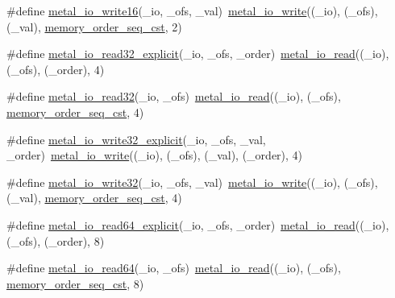 \begin{DoxyCompactItemize}
\item 
\#define \hyperlink{group__io_gab8016df69fa1998ac33c21a80e59c877}{metal\+\_\+io\+\_\+write16}(\+\_\+io,  \+\_\+ofs,  \+\_\+val)~\hyperlink{group__io_ga74ef56cd9b16bced8c2b8553956220b4}{metal\+\_\+io\+\_\+write}((\+\_\+io), (\+\_\+ofs), (\+\_\+val), \hyperlink{compiler_2gcc_2atomic_8h_a17c2de5ae768960284c047a320f17d1ba2d21914d1edd227a890107e7878a3752}{memory\+\_\+order\+\_\+seq\+\_\+cst}, 2)
\item 
\#define \hyperlink{group__io_ga66042ac971a891260b34a06dde2bfa58}{metal\+\_\+io\+\_\+read32\+\_\+explicit}(\+\_\+io,  \+\_\+ofs,  \+\_\+order)~\hyperlink{group__io_ga0cd8707fcac0d892726f1e946186c531}{metal\+\_\+io\+\_\+read}((\+\_\+io), (\+\_\+ofs), (\+\_\+order), 4)
\item 
\#define \hyperlink{group__io_ga53d4cb9c68694eb6421be22148030b2d}{metal\+\_\+io\+\_\+read32}(\+\_\+io,  \+\_\+ofs)~\hyperlink{group__io_ga0cd8707fcac0d892726f1e946186c531}{metal\+\_\+io\+\_\+read}((\+\_\+io), (\+\_\+ofs), \hyperlink{compiler_2gcc_2atomic_8h_a17c2de5ae768960284c047a320f17d1ba2d21914d1edd227a890107e7878a3752}{memory\+\_\+order\+\_\+seq\+\_\+cst}, 4)
\item 
\#define \hyperlink{group__io_ga9cf4ee0d917bcd208cac7e1e32034606}{metal\+\_\+io\+\_\+write32\+\_\+explicit}(\+\_\+io,  \+\_\+ofs,  \+\_\+val,  \+\_\+order)~\hyperlink{group__io_ga74ef56cd9b16bced8c2b8553956220b4}{metal\+\_\+io\+\_\+write}((\+\_\+io), (\+\_\+ofs), (\+\_\+val), (\+\_\+order), 4)
\item 
\#define \hyperlink{group__io_ga3adf9530fe9db77471ebf0547ce616f9}{metal\+\_\+io\+\_\+write32}(\+\_\+io,  \+\_\+ofs,  \+\_\+val)~\hyperlink{group__io_ga74ef56cd9b16bced8c2b8553956220b4}{metal\+\_\+io\+\_\+write}((\+\_\+io), (\+\_\+ofs), (\+\_\+val), \hyperlink{compiler_2gcc_2atomic_8h_a17c2de5ae768960284c047a320f17d1ba2d21914d1edd227a890107e7878a3752}{memory\+\_\+order\+\_\+seq\+\_\+cst}, 4)
\item 
\#define \hyperlink{group__io_ga295f7fd1050e811994df142561fad51f}{metal\+\_\+io\+\_\+read64\+\_\+explicit}(\+\_\+io,  \+\_\+ofs,  \+\_\+order)~\hyperlink{group__io_ga0cd8707fcac0d892726f1e946186c531}{metal\+\_\+io\+\_\+read}((\+\_\+io), (\+\_\+ofs), (\+\_\+order), 8)
\item 
\#define \hyperlink{group__io_gace90c4af8066a7a31111bbaaefbc631e}{metal\+\_\+io\+\_\+read64}(\+\_\+io,  \+\_\+ofs)~\hyperlink{group__io_ga0cd8707fcac0d892726f1e946186c531}{metal\+\_\+io\+\_\+read}((\+\_\+io), (\+\_\+ofs), \hyperlink{compiler_2gcc_2atomic_8h_a17c2de5ae768960284c047a320f17d1ba2d21914d1edd227a890107e7878a3752}{memory\+\_\+order\+\_\+seq\+\_\+cst}, 8)

\end{DoxyCompactItemize}
